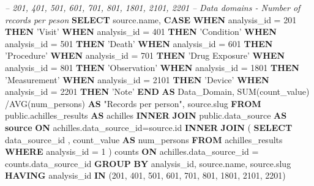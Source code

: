 \documentclass[]{book}
\newenvironment{Shaded}{\begin{snugshade}}{\end{snugshade}}
\newcommand{\KeywordTok}[1]{\textcolor[rgb]{0.13,0.29,0.53}{\textbf{#1}}}
\newcommand{\DecValTok}[1]{\textcolor[rgb]{0.00,0.00,0.81}{#1}}
\newcommand{\StringTok}[1]{\textcolor[rgb]{0.31,0.60,0.02}{#1}}
\newcommand{\CommentTok}[1]{\textcolor[rgb]{0.56,0.35,0.01}{\textit{#1}}}
\newcommand{\OtherTok}[1]{\textcolor[rgb]{0.56,0.35,0.01}{#1}}
\newcommand{\FunctionTok}[1]{\textcolor[rgb]{0.00,0.00,0.00}{#1}}
\newcommand{\NormalTok}[1]{#1}
\begin{document}
\begin{Shaded}
\begin{Highlighting}[]
\CommentTok{-- 201, 401, 501, 601, 701, 801, 1801, 2101, 2201   }
\CommentTok{-- Data domains - Number of records per peson}
\KeywordTok{SELECT} 
\NormalTok{    source.name,}
    \KeywordTok{CASE} 
      \KeywordTok{WHEN}\NormalTok{ analysis_id = }\DecValTok{201} \KeywordTok{THEN} \StringTok{'Visit'}
      \KeywordTok{WHEN}\NormalTok{ analysis_id = }\DecValTok{401} \KeywordTok{THEN} \StringTok{'Condition'}
      \KeywordTok{WHEN}\NormalTok{ analysis_id = }\DecValTok{501} \KeywordTok{THEN} \StringTok{'Death'}
      \KeywordTok{WHEN}\NormalTok{ analysis_id = }\DecValTok{601} \KeywordTok{THEN} \StringTok{'Procedure'}
      \KeywordTok{WHEN}\NormalTok{ analysis_id = }\DecValTok{701} \KeywordTok{THEN} \StringTok{'Drug Exposure'}
      \KeywordTok{WHEN}\NormalTok{ analysis_id = }\DecValTok{801} \KeywordTok{THEN} \StringTok{'Observation'}
      \KeywordTok{WHEN}\NormalTok{ analysis_id = }\DecValTok{1801} \KeywordTok{THEN} \StringTok{'Measurement'}
      \KeywordTok{WHEN}\NormalTok{ analysis_id = }\DecValTok{2101} \KeywordTok{THEN} \StringTok{'Device'}
      \KeywordTok{WHEN}\NormalTok{ analysis_id = }\DecValTok{2201} \KeywordTok{THEN} \StringTok{'Note'}
    \KeywordTok{END} \KeywordTok{AS}\NormalTok{ Data_Domain,}
    \FunctionTok{SUM}\NormalTok{(count_value) /AVG(num_persons) }\KeywordTok{AS} \OtherTok{"Records per person"}\NormalTok{,}
\NormalTok{    source.slug}
\KeywordTok{FROM}\NormalTok{ public.achilles_results }\KeywordTok{AS}\NormalTok{ achilles }
    \KeywordTok{INNER} \KeywordTok{JOIN}\NormalTok{ public.data_source }\KeywordTok{AS} \KeywordTok{source} \KeywordTok{ON} 
\NormalTok{      achilles.data_source_id=source.id}
    \KeywordTok{INNER} \KeywordTok{JOIN}\NormalTok{ (}
        \KeywordTok{SELECT}\NormalTok{ data_source_id , count_value }\KeywordTok{AS}\NormalTok{ num_persons }
        \KeywordTok{FROM}\NormalTok{ achilles_results }
        \KeywordTok{WHERE}\NormalTok{ analysis_id = }\DecValTok{1}
\NormalTok{        ) counts }\KeywordTok{ON} 
\NormalTok{      achilles.data_source_id = counts.data_source_id }
\KeywordTok{GROUP} \KeywordTok{BY}\NormalTok{ analysis_id, source.name, source.slug}
\KeywordTok{HAVING}\NormalTok{ analysis_id }\KeywordTok{IN}\NormalTok{ (}\DecValTok{201}\NormalTok{, }\DecValTok{401}\NormalTok{, }\DecValTok{501}\NormalTok{, }\DecValTok{601}\NormalTok{, }\DecValTok{701}\NormalTok{, }\DecValTok{801}\NormalTok{, }\DecValTok{1801}\NormalTok{, }\DecValTok{2101}\NormalTok{, }
    \DecValTok{2201}\NormalTok{)}
\end{Highlighting}
\end{Shaded}
\end{document}
